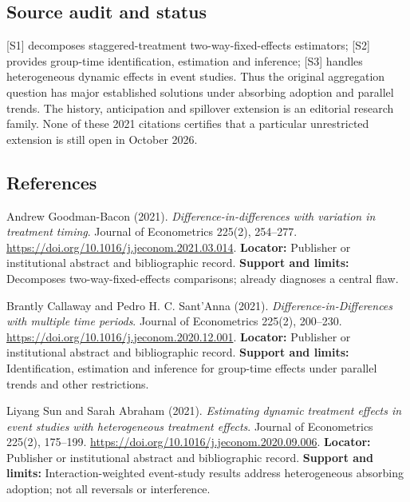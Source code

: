 \documentclass[11pt,a4paper]{article}
\begin{document}
\subsection*{Source audit and status}

[S1] decomposes staggered-treatment two-way-fixed-effects estimators; [S2] provides group-time identification, estimation and inference; [S3] handles heterogeneous dynamic effects in event studies. Thus the original aggregation question has major established solutions under absorbing adoption and parallel trends. The history, anticipation and spillover extension is an editorial research family. None of these 2021 citations certifies that a particular unrestricted extension is still open in October 2026.

\subsection*{References}

\begin{enumerate}[label={[\textnormal{S}\arabic*]},leftmargin=*]

\item Andrew Goodman-Bacon (2021). \emph{Difference-in-differences with variation in treatment timing}. Journal of Econometrics 225(2), 254–277. \url{https://doi.org/10.1016/j.jeconom.2021.03.014}. \textbf{Locator:} Publisher or institutional abstract and bibliographic record. \textbf{Support and limits:} Decomposes two-way-fixed-effects comparisons; already diagnoses a central flaw.

\item Brantly Callaway and Pedro H. C. Sant’Anna (2021). \emph{Difference-in-Differences with multiple time periods}. Journal of Econometrics 225(2), 200–230. \url{https://doi.org/10.1016/j.jeconom.2020.12.001}. \textbf{Locator:} Publisher or institutional abstract and bibliographic record. \textbf{Support and limits:} Identification, estimation and inference for group-time effects under parallel trends and other restrictions.

\item Liyang Sun and Sarah Abraham (2021). \emph{Estimating dynamic treatment effects in event studies with heterogeneous treatment effects}. Journal of Econometrics 225(2), 175–199. \url{https://doi.org/10.1016/j.jeconom.2020.09.006}. \textbf{Locator:} Publisher or institutional abstract and bibliographic record. \textbf{Support and limits:} Interaction-weighted event-study results address heterogeneous absorbing adoption; not all reversals or interference.

\end{enumerate}
\end{document}
